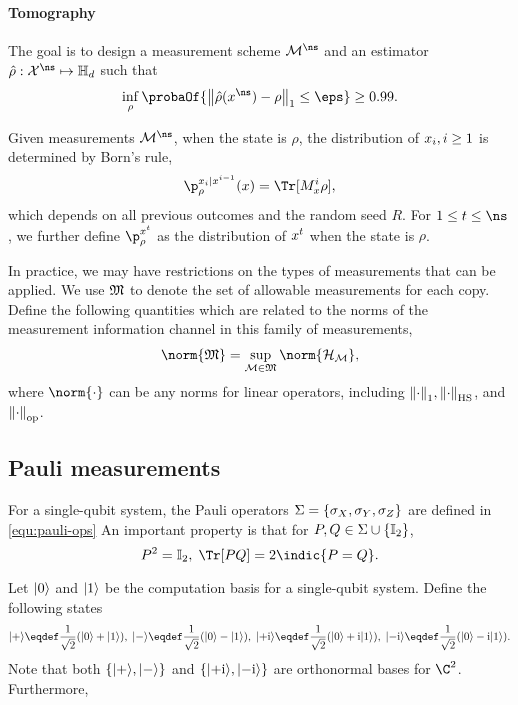\paragraph{Tomography} The goal is to design a measurement scheme $\POVM^\ns$ and an estimator $\qest:\outset^\ns\mapsto \Herm{\dims}$ such that
\[
\inf_{\rho}\probaOf{\tracenorm{\qest(\out^\ns)-\rho}\le \eps}\ge0.99.
\]

Given measurements $\POVM^\ns$, when the state is $\rho$, the distribution of ${x}_i,i\ge 1$ is determined by Born's rule,
\begin{equation}
    \p_\rho^{\out_i|\out^{i-1}}(x)=\Tr[M_x^i\rho],\label{equ:distr-i-cond}
\end{equation}
which depends on all previous outcomes and the random seed $R$. For $1\le t\le \ns$, we further define $\p_\rho^{\out^t}$ as the distribution of ${x}^t$ when the state is $\rho$.


In practice, we may have restrictions on the types of measurements that can be applied. We use ${\mathfrak{M}}$ to denote the set of allowable measurements for each copy. Define the following quantities which are related to the norms of the measurement information channel in this family of measurements,
\begin{align}
\norm{\povmset}=\sup_{\POVM\in\povmset}\norm{\Luders_{\POVM}},
\label{equ:max-povm-norm}
\end{align}
where $\norm{\cdot}$ can be any norms for linear operators, including ${\left\|\cdot\right\|}_{1}, {\left\|\cdot\right\|}_{\text{HS}}$, and ${\left\|\cdot\right\|}_{\text{op}}$.

\subsection{Pauli measurements}
For a single-qubit system, the Pauli operators $\Sigma=\{{\sigma_X}, {\sigma_Y}, {\sigma_Z}\}$ are defined in \cref{equ:pauli-ops} An important property is that for $P,Q\in \Sigma\cup \{\mathbb{I}_2\}$,
\begin{equation}
P^2=\eye_2,\;\Tr[PQ]=2\indic{P=Q}.    
\label{equ:pauli-property}
\end{equation}

 Let $|{0}\rangle$ and $|{1}\rangle$ be the computation basis for a single-qubit system. Define the following states
\[
\qbit{+}\eqdef \frac{1}{\sqrt{2}}(\qbit{0}+\qbit{1}),\; \qbit{-}\eqdef \frac{1}{\sqrt{2}}(\qbit{0}-\qbit{1}),
\;
\qbit{+\img}\eqdef \frac{1}{\sqrt{2}}(\qbit{0}+\img\qbit{1}),\; \qbit{-\img}\eqdef \frac{1}{\sqrt{2}}(\qbit{0}-\img\qbit{1}).
\]
Note that both $\{|{+}\rangle,|{-}\rangle\}$ and $\{|{+\text{i}}\rangle,|{-\text{i}}\rangle\}$ are orthonormal bases for $\C^2$. Furthermore,

